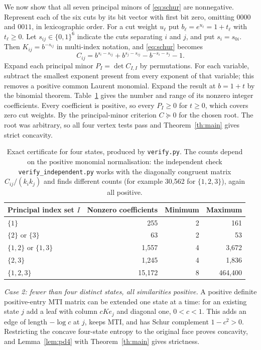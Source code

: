 \documentclass[11pt,a4paper]{article}
\theoremstyle{remark}
\begin{document}
We now show that all seven principal minors of \eqref{eq:schur} are nonnegative. Represent each of the six cuts by its bit vector with first bit zero, omitting $0000$ and $0011$, in lexicographic order. For a cut weight $u_\ell$ put $b_\ell=e^{u_\ell}=1+t_\ell$ with $t_\ell\ge0$. Let $s_{ij}\in\{0,1\}^6$ indicate the cuts separating $i$ and $j$, and put $s_i=s_{0i}$. Then $K_{ij}=b^{-s_{ij}}$ in multi-index notation, and \eqref{eq:schur} becomes
\[
 C_{ij}=b^{s_i-s_{ij}}+b^{s_j-s_{ij}}-b^{-s_i-s_j}-1 .
\]
Expand each principal minor $P_I=\det C_{I,I}$ by permutations. For each variable, subtract the smallest exponent present from every exponent of that variable; this removes a positive common Laurent monomial. Expand the result at $b=1+t$ by the binomial theorem. Table~\ref{tab:cert} gives the number and range of its nonzero integer coefficients. Every coefficient is positive, so every $P_I\ge0$ for $t\ge0$, which covers zero cut weights. By the principal-minor criterion $C\succeq0$ for the chosen root. The root was arbitrary, so all four vertex tests pass and Theorem~\ref{th:main} gives strict concavity.

\begin{table}[ht]
\centering\small
\begin{tabular}{lrrr}\toprule
Principal index set $I$ & Nonzero coefficients & Minimum & Maximum\\\midrule
$\{1\}$ &255&2&161\\
$\{2\}$ or $\{3\}$ &63&2&53\\
$\{1,2\}$ or $\{1,3\}$ &1,557&4&3,672\\
$\{2,3\}$ &1,245&4&1,836\\
$\{1,2,3\}$ &15,172&8&464,400\\\bottomrule
\end{tabular}
\caption{Exact certificate for four states, produced by \texttt{verify.py}. The counts depend on the positive monomial normalisation: the independent check \texttt{verify\_independent.py} works with the diagonally congruent matrix $C_{ij}/(k_ik_j)$ and finds different counts (for example 30,562 for $\{1,2,3\}$), again all positive.}\label{tab:cert}
\end{table}

\emph{Case 2: fewer than four distinct states, all similarities positive.} A positive definite positive-entry MTI matrix can be extended one state at a time: for an existing state $j$ add a leaf with column $cKe_j$ and diagonal one, $0<c<1$. This adds an edge of length $-\log c$ at $j$, keeps MTI, and has Schur complement $1-c^2>0$. Restricting the concave four-state entropy to the original face proves concavity, and Lemma~\ref{lem:pd4} with Theorem~\ref{th:main} gives strictness.
\end{document}
